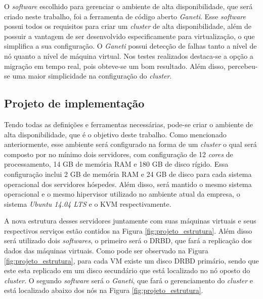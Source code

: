 O \textit{software} escolhido para gerenciar o ambiente de alta disponibilidade, que será criado neste trabalho, foi a ferramenta de código aberto 
\textit{Ganeti}. Esse \textit{software} possui todos os requisitos para criar um \textit{cluster} de alta disponibilidade, além de possuir a 
vantagem de ser desenvolvido especificamente para virtualização, o que simplifica a sua configuração. O \textit{Ganeti} possui detecção de falhas 
tanto a nível de nó quanto a nível de máquina virtual. Nos testes realizados destaca-se a opção a migração em tempo real, pois obteve-se um bom 
resultado. Além disso, percebeu-se uma maior simplicidade na configuração do \textit{cluster}.

\subsection{Projeto de implementação}
\label{section:projetoimpl}

Tendo todas as definições e ferramentas necessárias, pode-se criar o ambiente de alta disponibilidade, que é o objetivo deste trabalho.
Como mencionado anteriormente, esse ambiente será configurado na forma de um \textit{cluster} o qual será composto por no mínimo dois servidores, 
com configuração de 12 \textit{cores} de processamento, 14 GB de memória \ac{RAM} e 180 GB de disco rígido. Essa configuração inclui
2 GB de memória \ac{RAM} e 24 GB de disco para cada sistema operacional dos servidores hóspedes. Além disso, será mantido o mesmo sistema 
operacional e o mesmo hipervisor utilizado no ambiente atual da empresa, o sistema \textit{Ubuntu 14.04 \ac{LTS}} e o \ac{KVM} \cite{kvm} 
respectivamente.

A nova estrutura desses servidores juntamente com suas máquinas virtuais e seus respectivos serviços estão contidos na Figura 
\ref{fig:projeto_estrutura}. Além disso será utilizado dois \textit{softwares}, o primeiro será o \ac{DRBD}, que fará a replicação dos dados 
das máquinas virtuais. Como pode ser observado na Figura \ref{fig:projeto_estrutura}, para cada \ac{VM} existe um disco \ac{DRBD} primário, 
sendo que este esta replicado em um disco secundário que está localizado no nó oposto do \textit{cluster}. O segundo \textit{software} será o 
\textit{Ganeti}, que fará o gerenciamento do \textit{cluster} e está localizado abaixo dos nós na Figura \ref{fig:projeto_estrutura}.

